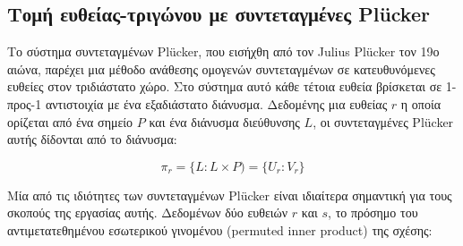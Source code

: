\subsection{Τομή ευθείας-τριγώνου με συντεταγμένες Plücker}
\label{chapter:algs_pluck}
\noindent  Το σύστημα συντεταγμένων Plücker, που εισήχθη από τον Julius Plücker τον 19ο αιώνα\cite{plücker1828analytisch}, παρέχει μια μέθοδο ανάθεσης ομογενών συντεταγμένων σε κατευθυνόμενες ευθείες στον τριδιάστατο χώρο\cite{EricksonPlucker}. Στο σύστημα αυτό κάθε τέτοια ευθεία βρίσκεται σε 1-προς-1 αντιστοιχία με ένα εξαδιάστατο  διάνυσμα. Δεδομένης μια ευθείας $r$ η οποία ορίζεται από ένα σημείο $P$ και ένα διάνυσμα διεύθυνσης $L$, οι συντεταγμένες Plücker αυτής δίδονται από το διάνυσμα:

\begin{equation}
 \pi_r = \{L : L \times P ) = \{U_r : V_r\}		
\label{eq:plucker} 
\end{equation}

Μία από τις ιδιότητες των συντεταγμένων Plücker είναι ιδιαίτερα σημαντική για τους σκοπούς της εργασίας αυτής. Δεδομένων δύο ευθειών $r$ και $s$, το πρόσημο του αντιμετατεθημένου εσωτερικού γινομένου (permuted inner product) της σχέσης:

